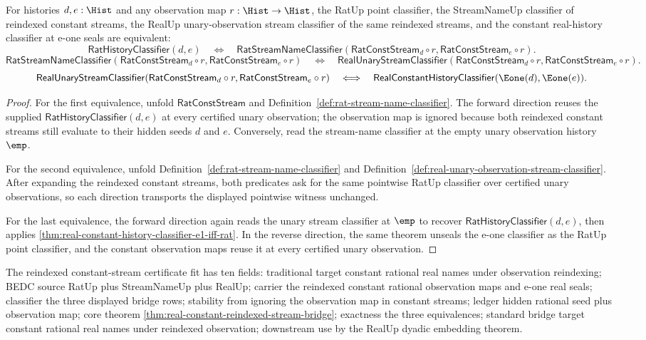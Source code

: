 \begin{theorem}
\label{thm:real-constant-reindexed-stream-bridge}
For histories $d,e:\Hist$ and any observation map $r:\Hist\to\Hist$, the
RatUp point classifier, the StreamNameUp classifier of reindexed constant
streams, the RealUp unary-observation stream classifier of the same reindexed
streams, and the constant real-history classifier at e-one seals are
equivalent:
$$
\mathsf{RatHistoryClassifier}(d,e)
\quad\Longleftrightarrow\quad
\mathsf{RatStreamNameClassifier}(\mathsf{RatConstStream}_d\circ r,
\mathsf{RatConstStream}_e\circ r).
$$
$$
\mathsf{RatStreamNameClassifier}(\mathsf{RatConstStream}_d\circ r,
\mathsf{RatConstStream}_e\circ r)
\quad\Longleftrightarrow\quad
\mathsf{RealUnaryStreamClassifier}(\mathsf{RatConstStream}_d\circ r,
\mathsf{RatConstStream}_e\circ r).
$$
$$
\mathsf{RealUnaryStreamClassifier}(\mathsf{RatConstStream}_d\circ r,
\mathsf{RatConstStream}_e\circ r)
\quad\Longleftrightarrow\quad
\mathsf{RealConstantHistoryClassifier}(\Eone(d),\Eone(e)).
$$
\end{theorem}
\begin{proof}
For the first equivalence, unfold $\mathsf{RatConstStream}$ and
Definition~\ref{def:rat-stream-name-classifier}. The forward direction reuses
the supplied $\mathsf{RatHistoryClassifier}(d,e)$ at every certified unary
observation; the observation map is ignored because both reindexed constant
streams still evaluate to their hidden seeds $d$ and $e$. Conversely, read the
stream-name classifier at the empty unary observation history $\emp$.

For the second equivalence, unfold
Definition~\ref{def:rat-stream-name-classifier} and
Definition~\ref{def:real-unary-observation-stream-classifier}. After expanding
the reindexed constant streams, both predicates ask for the same pointwise
RatUp classifier over certified unary observations, so each direction transports
the displayed pointwise witness unchanged.

For the last equivalence, the forward direction again reads the unary stream
classifier at $\emp$ to recover $\mathsf{RatHistoryClassifier}(d,e)$, then
applies \autoref{thm:real-constant-history-classifier-e1-iff-rat}. In the
reverse direction, the same theorem unseals the e-one classifier as the RatUp
point classifier, and the constant observation maps reuse it at every certified
unary observation.
\end{proof}

The reindexed constant-stream certificate fit has ten fields: traditional target
constant rational real names under observation reindexing; BEDC source RatUp
plus StreamNameUp plus RealUp; carrier the reindexed constant rational
observation maps and e-one real seals; classifier the three displayed bridge
rows; stability from ignoring the observation map in constant streams; ledger
hidden rational seed plus observation map; core theorem
\autoref{thm:real-constant-reindexed-stream-bridge}; exactness the three
equivalences; standard bridge target constant rational real names under
reindexed observation; downstream use by the RealUp dyadic embedding theorem.

